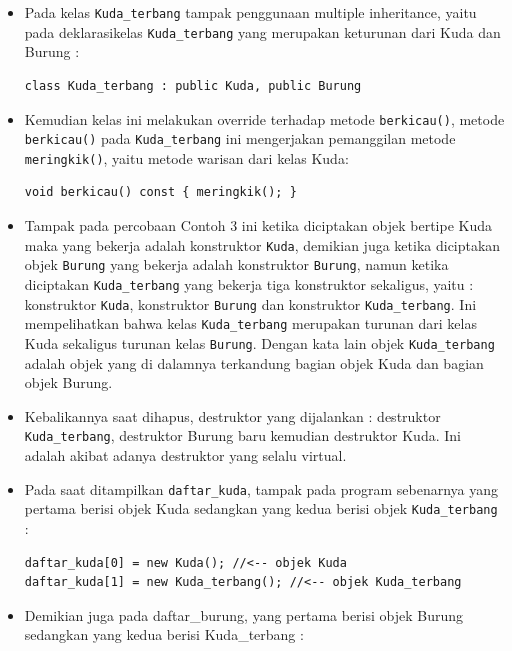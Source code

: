 \begin{itemize}
\item
  Pada kelas \texttt{Kuda\_terbang} tampak penggunaan multiple
  inheritance, yaitu pada deklarasikelas \texttt{Kuda\_terbang} yang
  merupakan keturunan dari Kuda dan Burung :

\begin{verbatim}
class Kuda_terbang : public Kuda, public Burung
\end{verbatim}
\item
  Kemudian kelas ini melakukan override terhadap metode
  \texttt{berkicau()}, metode \texttt{berkicau()} pada
  \texttt{Kuda\_terbang} ini mengerjakan pemanggilan metode
  \texttt{meringkik()}, yaitu metode warisan dari kelas Kuda:

\begin{verbatim}
void berkicau() const { meringkik(); }
\end{verbatim}
\item
  Tampak pada percobaan Contoh 3 ini ketika diciptakan objek bertipe
  Kuda maka yang bekerja adalah konstruktor \texttt{Kuda}, demikian juga
  ketika diciptakan objek \texttt{Burung} yang bekerja adalah
  konstruktor \texttt{Burung}, namun ketika diciptakan
  \texttt{Kuda\_terbang} yang bekerja tiga konstruktor sekaligus, yaitu
  : konstruktor \texttt{Kuda}, konstruktor \texttt{Burung} dan
  konstruktor \texttt{Kuda\_terbang}. Ini mempelihatkan bahwa kelas
  \texttt{Kuda\_terbang} merupakan turunan dari kelas Kuda sekaligus
  turunan kelas \texttt{Burung}. Dengan kata lain objek
  \texttt{Kuda\_terbang} adalah objek yang di dalamnya terkandung bagian
  objek Kuda dan bagian objek Burung.
\item
  Kebalikannya saat dihapus, destruktor yang dijalankan : destruktor
  \texttt{Kuda\_terbang}, destruktor Burung baru kemudian destruktor
  Kuda. Ini adalah akibat adanya destruktor yang selalu virtual.
\item
  Pada saat ditampilkan \texttt{daftar\_kuda}, tampak pada program
  sebenarnya yang pertama berisi objek Kuda sedangkan yang kedua berisi
  objek \texttt{Kuda\_terbang} :

\begin{verbatim}
daftar_kuda[0] = new Kuda(); //<-- objek Kuda
daftar_kuda[1] = new Kuda_terbang(); //<-- objek Kuda_terbang
\end{verbatim}
\item
  Demikian juga pada daftar\_burung, yang pertama berisi objek Burung
  sedangkan yang kedua berisi Kuda\_terbang :


\end{itemize}

